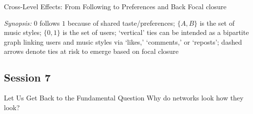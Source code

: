 \documentclass[notes, aspectratio=1610]{beamer}
\begin{document}
\begin{frame}{Cross-Level Effects: From Following to Preferences and Back}
	{Focal closure}
	\centering
	

	\raggedright
	\small
	\textit{Synopsis:} $0$ follows $1$ because of shared taste/preferences; 
	$\{A, B\}$ is the set of music styles; $\{0, 1\}$ is
	the set of users; `vertical' ties can be intended as a bipartite 
	graph linking users and music styles via `likes,' `comments,' or
	`reposts'; dashed arrows denote ties at risk to emerge based on 
	focal closure 
\end{frame}

\subsection{Session 7}

\begin{frame}{Let Us Get Back to the Fundamental Question}{}
\centering
\Large 
Why do networks look how they look?
\end{frame}
\end{document}
